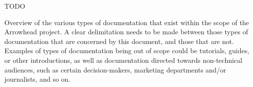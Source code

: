 %
%

TODO

Overview of the various types of documentation that exist within the scope of the Arrowhead project.
A clear delimitation needs to be made between those types of documentation that are concerned by this document, and those that are not.
Examples of types of documentation being out of scope could be tutorials, guides, or other introductions, as well as documentation directed towards non-technical audiences, such as certain decision-makers, marketing departments and/or journalists, and so on.